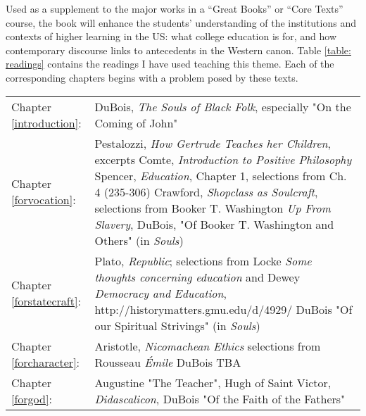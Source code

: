 Used as a supplement to the major works in a ``Great Books'' or ``Core Texts'' course, the book will enhance the students' understanding of the institutions and contexts of higher learning in the US: what college education is for, and how contemporary discourse links to antecedents in the Western canon. Table \ref{table: readings} contains the readings I have used teaching this theme. Each of the corresponding chapters begins with a problem posed by these texts.

 \begin{longtable}[!t]{ | p{4cm} | P{6.5cm} |   }
\hline 

 & \\ \hline
Chapter \ref{introduction}: &DuBois, \emph{The Souls of Black Folk}, especially "On the Coming of John"\\ \hline
Chapter \ref{forvocation}: &
Pestalozzi, \emph{How Gertrude Teaches her Children}, excerpts\newline
Comte, \emph{Introduction to Positive Philosophy}\newline
Spencer, \emph{Education}, Chapter 1, selections from Ch. 4 (235-306)\newline
Crawford, \emph{Shopclass as Soulcraft}, \newline 
selections from Booker T. Washington  \emph{Up From Slavery}, \newline 
DuBois, "Of Booker T. Washington and Others" (in \emph{Souls})\\ \hline
 Chapter \ref{forstatecraft}: &
Plato,  \emph{Republic}; 
\newline selections from Locke \emph{Some thoughts concerning education} and Dewey \emph{Democracy and Education},  http://historymatters.gmu.edu/d/4929/ \newline 
DuBois "Of our Spiritual Strivings" (in \emph{Souls})\\ \hline
 Chapter \ref{forcharacter}: &Aristotle,  \emph{Nicomachean Ethics} \newline selections from Rousseau \emph{\'Emile} \newline DuBois TBA \\ \hline
Chapter \ref{forgod}: &Augustine "The Teacher", \newline Hugh of Saint Victor,  \emph{Didascalicon}, \newline DuBois "Of the Faith of the Fathers"\\ \hline

\end{longtable}
